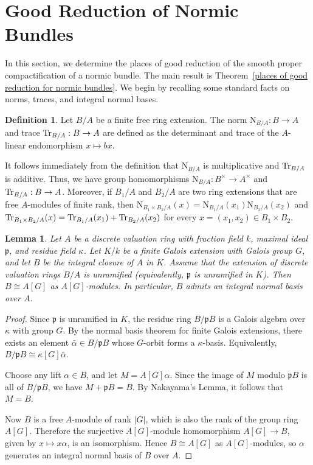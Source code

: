 \documentclass[10pt]{amsart}
\theoremstyle{plain}
\newtheorem{lemma}[thm]{Lemma}
\theoremstyle{definition}
\newtheorem{definition}[thm]{Definition}
\newcommand{\Tr}{{\rm Tr}}
\newcommand{\p}{{\mathfrak p}}
\newcommand{\Nm}{\mathrm{N}}
\begin{document}
\section{Good Reduction of Normic Bundles}
In this section, we determine the places of good reduction of the smooth proper compactification of a normic bundle. The main result is Theorem~\ref{places of good reduction for normic bundles}. We begin by recalling some standard facts on norms, traces, and integral normal bases.
\begin{definition}
Let \(B/A\) be a finite free ring extension. The norm \(\Nm_{B/A}:B\to A\) and trace \(\Tr_{B/A}:B\to A\) are defined as the determinant and trace of the \(A\)-linear endomorphism \(x\mapsto bx\).
\end{definition}

It follows immediately from the definition that \(\Nm_{B/A}\) is multiplicative and
\(\Tr_{B/A}\) is additive. Thus, we have group homomorphisms
\(\Nm_{B/A}: B^\times \to A^\times\) and
\(\Tr_{B/A}: B \to A\). Moreover, if \(B_1/A\) and \(B_2/A\) are two ring extensions that are free
\(A\)-modules of finite rank, then
\(\Nm_{B_1\times B_2/A}(x)
= \Nm_{B_1/A}(x_1)\Nm_{B_2/A}(x_2)\)
and
\(\Tr_{B_1\times B_2/A}(x)
= \Tr_{B_1/A}(x_1)+\Tr_{B_2/A}(x_2)\)
for every \(x=(x_1,x_2)\in B_1\times B_2\).

\begin{lemma}\label{normal integral basis}
Let $A$ be a discrete valuation ring with fraction field $k$, maximal ideal
$\mathfrak p$, and residue field $\kappa$. Let $K/k$ be a finite Galois
extension with Galois group $G$, and let $B$ be the integral closure of $A$ in
$K$. Assume that the extension of discrete valuation rings $B/A$ is
unramified (equivalently, $\mathfrak p$ is unramified in $K$). Then
$B\cong A[G]$ as $A[G]$-modules. In particular, $B$ admits an integral normal
basis over $A$.
\end{lemma}

\begin{proof}
Since $\p$ is unramified in $K$, the residue ring $B/\mathfrak{p}B$ is a Galois algebra over $\kappa$ with group $G$. By the normal basis theorem for finite Galois extensions, there exists an element $\bar{\alpha}\in B/\mathfrak{p}B$ whose $G$-orbit forms a $\kappa$-basis. Equivalently, $B/\mathfrak{p}B \cong \kappa[G]\bar{\alpha}$.

Choose any lift $\alpha\in B$, and let $M=A[G]\alpha$. Since the image of $M$ modulo $\mathfrak{p}B$ is all of $B/\mathfrak{p}B$, we have $M+\mathfrak{p}B=B$. By Nakayama's Lemma, it follows that $M=B$.

Now $B$ is a free $A$-module of rank $|G|$, which is also the rank of the group ring $A[G]$. Therefore the surjective $A[G]$-module homomorphism $A[G]\to B$, given by $x\mapsto x\alpha$, is an isomorphism. Hence $B\cong A[G]$ as $A[G]$-modules, so $\alpha$ generates an integral normal basis of $B$ over $A$.
\end{proof}
\end{document}
